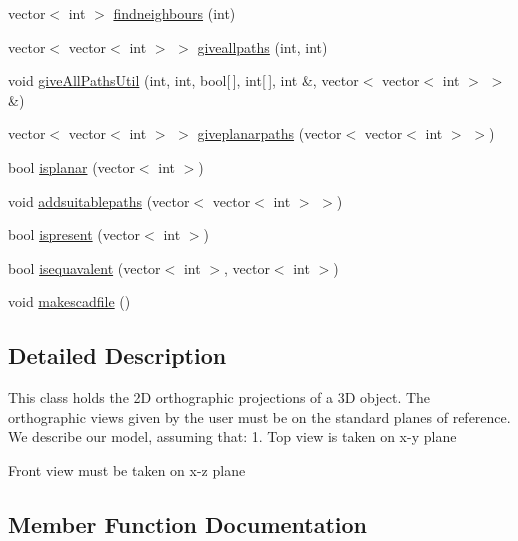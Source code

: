\begin{DoxyCompactItemize}
vector$<$ int $>$ \hyperlink{class_projection2_d_ac86b5c70c7ad7d1e3e3df3f41161bec7}{findneighbours} (int)
\item 
vector$<$ vector$<$ int $>$ $>$ \hyperlink{class_projection2_d_a2be0e30485d5fb74edefac1c31ce46a2}{giveallpaths} (int, int)
\item 
void \hyperlink{class_projection2_d_afcafeef06178e9d071c1f25f5ab7c4da}{give\+All\+Paths\+Util} (int, int, bool\mbox{[}$\,$\mbox{]}, int\mbox{[}$\,$\mbox{]}, int \&, vector$<$ vector$<$ int $>$ $>$ \&)
\item 
vector$<$ vector$<$ int $>$ $>$ \hyperlink{class_projection2_d_a77acf0c6b5c00735c12e34f218b4c361}{giveplanarpaths} (vector$<$ vector$<$ int $>$ $>$)
\item 
bool \hyperlink{class_projection2_d_a4b86c26f97d2a91f7fde20fa7ab51092}{isplanar} (vector$<$ int $>$)
\item 
void \hyperlink{class_projection2_d_ac8e6feedf3873847f2868ce5b5f0b77a}{addsuitablepaths} (vector$<$ vector$<$ int $>$ $>$)
\item 
bool \hyperlink{class_projection2_d_ac2f97acfe9d066a026b7b8edc2d24c2c}{ispresent} (vector$<$ int $>$)
\item 
bool \hyperlink{class_projection2_d_a65a00d3f14f35c5b19d88cfb0ffd1e49}{isequavalent} (vector$<$ int $>$, vector$<$ int $>$)
\item 
void \hyperlink{class_projection2_d_ab0bddff5a0c3cc8177bbedc3713501e0}{makescadfile} ()
\end{DoxyCompactItemize}


\subsection{Detailed Description}
This class holds the 2D orthographic projections of a 3D object. The orthographic views given by the user must be on the standard planes of reference. We describe our model, assuming that\+: 1. Top view is taken on x-\/y plane
\begin{DoxyEnumerate}
\item Front view must be taken on x-\/z plane 
\end{DoxyEnumerate}

\subsection{Member Function Documentation}
